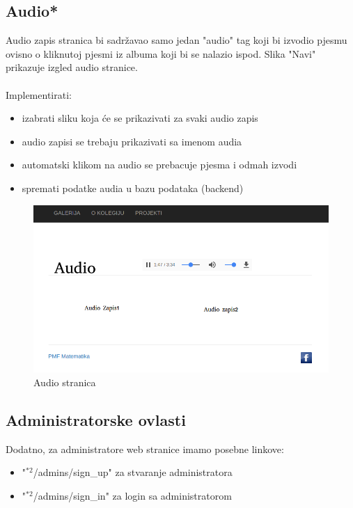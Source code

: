 \documentclass[]{article}
\begin{document}
\subsection{Audio*}
Audio zapis stranica bi sadržavao samo jedan "audio" tag koji bi izvodio pjesmu ovisno o kliknutoj pjesmi iz albuma koji bi se nalazio ispod. Slika "Navi" prikazuje izgled audio stranice.
\\
\\
Implementirati:
\begin{itemize}
	\item izabrati sliku koja će se prikazivati za svaki audio zapis
	\item audio zapisi se trebaju prikazivati sa imenom audia
	\item automatski klikom na audio se prebacuje pjesma i odmah izvodi
	\item spremati podatke audia u bazu podataka (backend)
\end{itemize}

\begin{figure}[h]
	\centering
	\includegraphics[scale=0.3]{audio}
	\caption{Audio stranica}
	\label{fig:mesh1}
\end{figure}

\newpage

\subsection{Administratorske ovlasti}
Dodatno, za administratore web stranice imamo posebne linkove:
\begin{itemize}
	\item "$^{*2}$/admins/sign\_up" za stvaranje administratora
	\item "$^{*2}$/admins/sign\_in" za login sa administratorom
\end{itemize}
\end{document}
